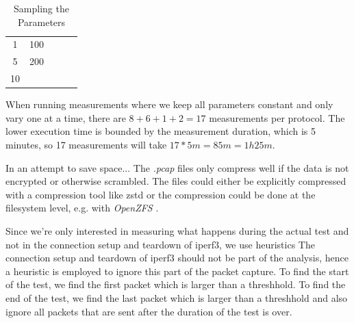 \begin{table}[tbh]
\begin{tabular}{ccccc}
		\rowcolor[HTML]{EFEFEF}
		1                                                                & 100                                                               &                                                                    &                                                                       &                                                                             \\
		\rowcolor[HTML]{FFFFFF}
		5                                                                & 200                                                               &                                                                    &                                                                       &                                                                             \\
		\rowcolor[HTML]{EFEFEF}
		10                                                               &                                                                   &                                                                    &                                                                       &                                                                             \\ \bottomrule
	\end{tabular}
	\caption{Sampling the Parameters}
	\label{tab:parameters}
\end{table}

When running measurements where we keep all parameters constant and only vary one at a time, there are $8 + 6 + 1 + 2 = 17$ measurements per protocol.
The lower execution time is bounded by the measurement duration, which is 5 minutes, so 17 measurements will take $17 * 5 m = 85 m = 1h25m$.







In an attempt to save space...
The \textit{.pcap} \cite{wiki:Pcap} files only compress well if the data is not encrypted or otherwise scrambled.
The files could either be explicitly compressed with a compression tool like zstd or the compression could be done at the filesystem level, e.g. with \textit{OpenZFS} \cite{OpenZFS}. 


Since we're only interested in measuring what happens during the actual test and not in the connection setup and teardown of iperf3, we use heuristics
The connection setup and teardown of iperf3 should not be part of the analysis, hence a heuristic is employed to ignore this part of the packet capture.
To find the start of the test, we find the first packet which is larger than a threshhold.
To find the end of the test, we find the last packet which is larger than a threshhold and also ignore all packets that are sent after the duration of the test is over.

